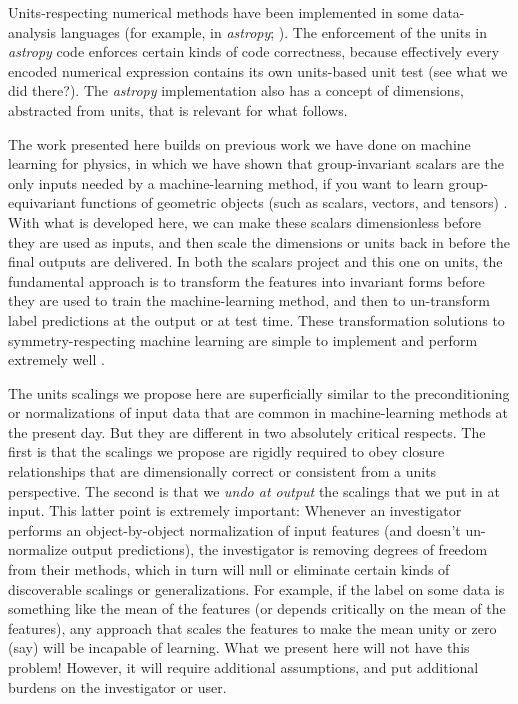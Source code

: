 \documentclass{article}
\newcommand{\project}[1]{\textsl{#1}}
\newcommand{\astropy}{\project{astropy}}
\begin{document}
Units-respecting numerical methods have been implemented in some data-analysis languages (for example, in \astropy; \cite{astropy}).
The enforcement of the units in \astropy{} code enforces certain kinds of code correctness, because effectively every encoded numerical expression contains its own units-based unit test (see what we did there?).
The \astropy{} implementation also has a concept of dimensions, abstracted from units, that is relevant for what follows.

The work presented here builds on previous work we have done on machine learning for physics, in which we have shown that group-invariant scalars are the only inputs needed by a machine-learning method, if you want to learn group-equivariant functions of geometric objects (such as scalars, vectors, and tensors) \cite{villar, yao}.
With what is developed here, we can make these scalars dimensionless before they are used as inputs, and then scale the dimensions or units back in before the final outputs are delivered.
In both the scalars project and this one on units, the fundamental approach is to transform the features into invariant forms before they are used to train the machine-learning method, and then to un-transform label predictions at the output or at test time.
These transformation solutions to symmetry-respecting machine learning are simple to implement and perform extremely well \cite{yao}.

The units scalings we propose here are superficially similar to the preconditioning or normalizations of input data that are common in machine-learning methods at the present day.
But they are different in two absolutely critical respects.
The first is that the scalings we propose are rigidly required to obey closure relationships that are dimensionally correct or consistent from a units perspective.
The second is that we \emph{undo at output} the scalings that we put in at input.
This latter point is extremely important:
Whenever an investigator performs an object-by-object normalization of input features (and doesn't un-normalize output predictions), the investigator is removing degrees of freedom from their methods, which in turn will null or eliminate certain kinds of discoverable scalings or generalizations.
For example, if the label on some data is something like the mean of the features (or depends critically on the mean of the features), any approach that scales the features to make the mean unity or zero (say) will be incapable of learning.
What we present here will not have this problem!
However, it will require additional assumptions, and put additional burdens on the investigator or user.
\end{document}
